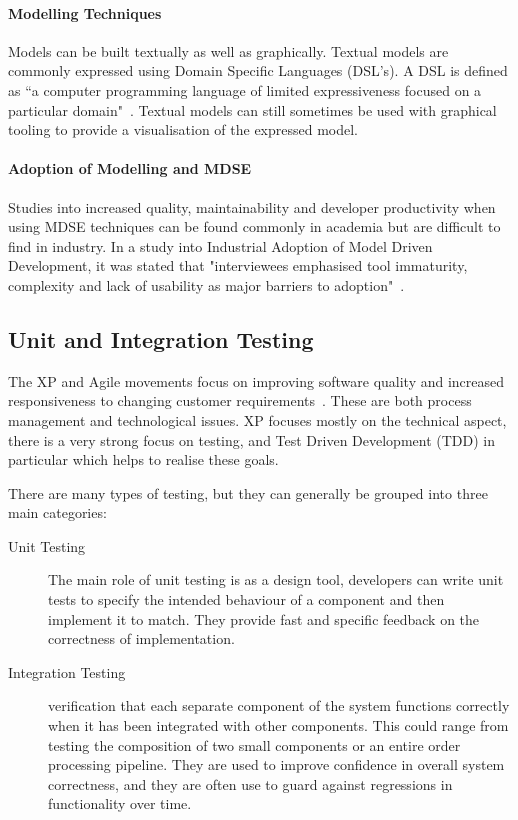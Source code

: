 \documentclass{cshonours}
\begin{document}
\paragraph{Modelling Techniques}
Models can be built textually as well as graphically. Textual models are commonly expressed using Domain Specific Languages (DSL’s). A DSL is defined as ``a computer programming language of limited expressiveness focused on a particular domain"~\cite{FowlerDSL}. Textual models can still sometimes be used with graphical tooling to provide a visualisation of the expressed model.

\paragraph{Adoption of Modelling and MDSE}

Studies into increased quality, maintainability and developer productivity when using MDSE techniques can be found commonly in academia but are difficult to find in industry. In a study into Industrial Adoption of Model Driven Development, it was stated that "interviewees emphasised tool immaturity, complexity and lack of usability as major barriers to adoption"~\cite{IndustryMDSE}.

\pagebreak
\subsection{Unit and Integration Testing}

The XP and Agile movements focus on improving software quality and increased responsiveness to changing customer requirements~\cite{WikiXP}. These are both process management and technological issues. XP focuses mostly on the technical aspect, there is a very strong focus on testing, and Test Driven Development (TDD) in particular which helps to realise these goals.

There are many types of testing, but they can generally be grouped into three main categories:

\begin{description}
  \item[Unit Testing] The main role of unit testing is as a design tool, developers can write unit tests to specify the intended behaviour of a component and then implement it to match. They provide fast and specific feedback on the correctness of implementation.
  \item[Integration Testing] verification that each separate component of the system functions correctly when it has been integrated with other components. This could range from testing the composition of two small components or an entire order processing pipeline. They are used to improve confidence in overall system correctness, and they are often use to guard against regressions in functionality over time.
\end{description}
\end{document}
